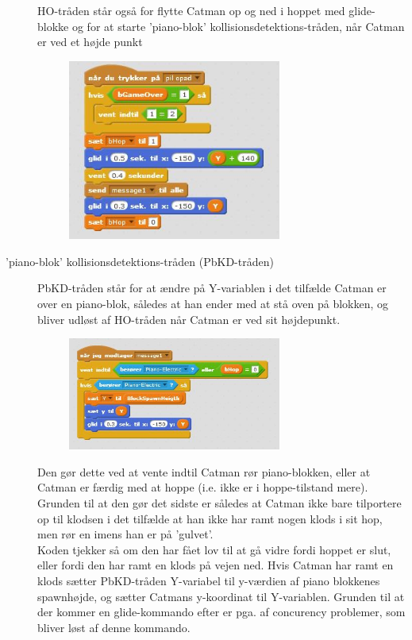 \documentclass[12pt, a4paper, hidelinks]{article}
\begin{document}
\begin{description}
HO-tråden står også for flytte Catman op og ned i hoppet med glide-blokke og for at starte 'piano-blok' kollisionsdetektions-tråden, når Catman er ved et højde punkt 

\begin{figure}
  \begin{center}
    \includegraphics[width=70mm]{TKatPilOp.jpg}
  \end{center}
  \caption{}
  \label{fig:sample}
\end{figure}
\FloatBarrier

\item[ 'piano-blok' kollisionsdetektions-tråden (PbKD-tråden)] PbKD-tråden står for at ændre på Y-variablen i det tilfælde Catman er over en piano-blok, således at han ender med at stå oven på blokken, og bliver udløst af HO-tråden når Catman er ved sit højdepunkt. \\ 

\begin{figure}
  \begin{center}
    \includegraphics[width=70mm]{TKatPianoColDetect.jpg}
  \end{center}
  \caption{}
  \label{fig:sample}
\end{figure}
\FloatBarrier

Den gør dette ved at vente indtil Catman rør piano-blokken, eller at Catman er færdig med at hoppe (i.e. ikke er i hoppe-tilstand mere). Grunden til at den gør det sidste er således at Catman ikke bare tilportere op til klodsen i det tilfælde at han ikke har ramt nogen klods i sit hop, men rør en imens han er på 'gulvet'. \\ Koden tjekker så om den har fået lov til at gå vidre fordi hoppet er slut, eller fordi den har ramt en klods på vejen ned. Hvis Catman har ramt en klods sætter PbKD-tråden Y-variabel til y-værdien af piano blokkenes spawnhøjde, og sætter Catmans y-koordinat til Y-variablen. Grunden til at der kommer en glide-kommando efter er pga. af concurency problemer, som bliver løst af denne kommando.


\end{description}
\end{document}

